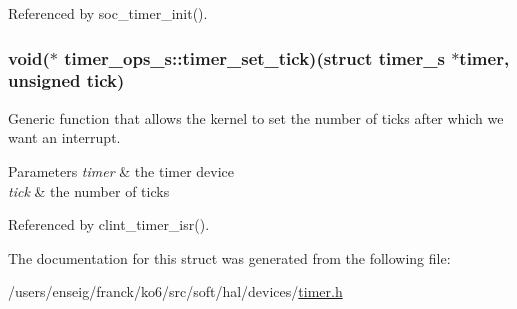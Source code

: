Referenced by soc\-\_\-timer\-\_\-init().

\hypertarget{structtimer__ops__s_a4c7be27a967a8aa56bfb785e80afb254}{
\subsubsection[{timer\-\_\-set\-\_\-tick}]{\setlength{\rightskip}{0pt plus 5cm}void($\ast$ timer\-\_\-ops\-\_\-s\-::timer\-\_\-set\-\_\-tick)(struct {\bf timer\-\_\-s} $\ast$timer, unsigned tick)}}\label{structtimer__ops__s_a4c7be27a967a8aa56bfb785e80afb254}


Generic function that allows the kernel to set the number of ticks after which we want an interrupt. 


\begin{DoxyParams}{Parameters}
{\em timer} & the timer device \\
\hline
{\em tick} & the number of ticks \\
\hline
\end{DoxyParams}


Referenced by clint\-\_\-timer\-\_\-isr().



The documentation for this struct was generated from the following file\-:\begin{DoxyCompactItemize}
\item 
/users/enseig/franck/ko6/src/soft/hal/devices/\hyperlink{timer_8h}{timer.\-h}\end{DoxyCompactItemize}
